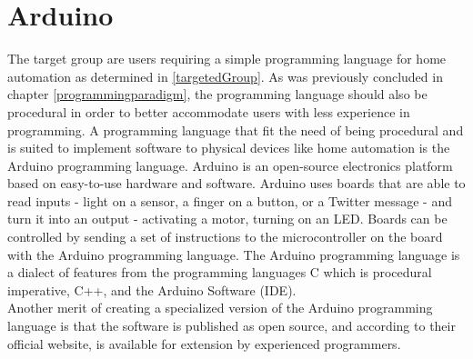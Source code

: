 \section{Arduino}
The target group are users requiring a simple programming language for home automation as determined in \ref{targetedGroup}. As was previously concluded in chapter \ref{programmingparadigm}, the programming language should also be procedural in order to better accommodate users with less experience in programming. 
A programming language that fit the need of being procedural and is suited to implement software to physical devices like home automation is the Arduino programming language. Arduino is an open-source electronics platform based on easy-to-use hardware and software. Arduino uses boards that are able to read inputs - light on a sensor, a finger on a button, or a Twitter message - and turn it into an output - activating a motor, turning on an LED. Boards can be controlled by sending a set of instructions to the microcontroller on the board with the Arduino programming language. The Arduino programming language is a dialect of features from the programming languages C which is procedural imperative, C++, and the Arduino Software (IDE)\cite{audionocc}. \\ 


Another merit of creating a specialized version of the Arduino programming language is that the software is published as open source, and according to their official website, is available for extension by experienced programmers\cite{audionocc}.








